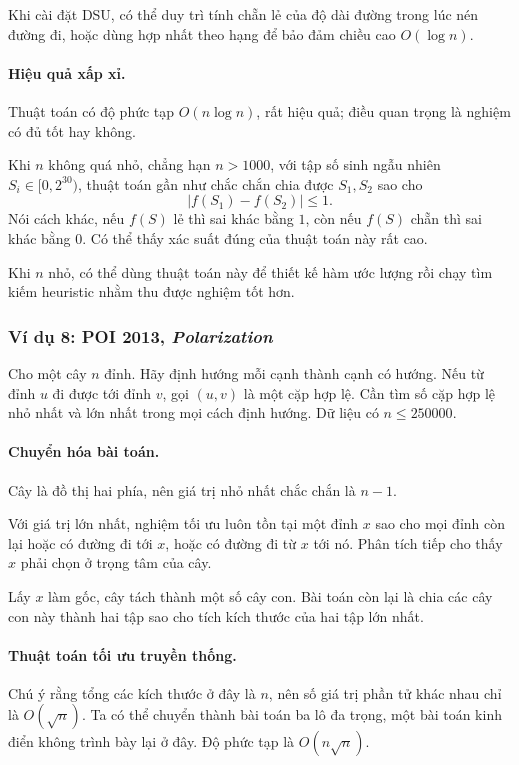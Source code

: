 \documentclass[11pt]{article}
\begin{document}
Khi cài đặt DSU, có thể duy trì tính chẵn lẻ của độ dài đường trong lúc nén
đường đi, hoặc dùng hợp nhất theo hạng để bảo đảm chiều cao \(O(\log n)\).

\paragraph{Hiệu quả xấp xỉ.}
Thuật toán có độ phức tạp \(O(n\log n)\), rất hiệu quả; điều quan trọng là nghiệm
có đủ tốt hay không.

Khi \(n\) không quá nhỏ, chẳng hạn \(n>1000\), với tập số sinh ngẫu nhiên
\(S_i\in[0,2^{30})\), thuật toán gần như chắc chắn chia được \(S_1,S_2\) sao cho
\[
  |f(S_1)-f(S_2)|\le 1.
\]
Nói cách khác, nếu \(f(S)\) lẻ thì sai khác bằng \(1\), còn nếu \(f(S)\) chẵn
thì sai khác bằng \(0\). Có thể thấy xác suất đúng của thuật toán này rất cao.

Khi \(n\) nhỏ, có thể dùng thuật toán này để thiết kế hàm ước lượng rồi chạy tìm
kiếm heuristic nhằm thu được nghiệm tốt hơn.

\subsubsection{Ví dụ 8: POI 2013, \emph{Polarization}}

Cho một cây \(n\) đỉnh. Hãy định hướng mỗi cạnh thành cạnh có hướng. Nếu từ đỉnh
\(u\) đi được tới đỉnh \(v\), gọi \((u,v)\) là một cặp hợp lệ. Cần tìm số cặp
hợp lệ nhỏ nhất và lớn nhất trong mọi cách định hướng. Dữ liệu có
\(n\le 250000\).

\paragraph{Chuyển hóa bài toán.}
Cây là đồ thị hai phía, nên giá trị nhỏ nhất chắc chắn là \(n-1\).

Với giá trị lớn nhất, nghiệm tối ưu luôn tồn tại một đỉnh \(x\) sao cho mọi đỉnh
còn lại hoặc có đường đi tới \(x\), hoặc có đường đi từ \(x\) tới nó. Phân tích
tiếp cho thấy \(x\) phải chọn ở trọng tâm của cây.

Lấy \(x\) làm gốc, cây tách thành một số cây con. Bài toán còn lại là chia các
cây con này thành hai tập sao cho tích kích thước của hai tập lớn nhất.

\paragraph{Thuật toán tối ưu truyền thống.}
Chú ý rằng tổng các kích thước ở đây là \(n\), nên số giá trị phần tử khác nhau
chỉ là \(O(\sqrt n)\). Ta có thể chuyển thành bài toán ba lô đa trọng, một bài
toán kinh điển không trình bày lại ở đây. Độ phức tạp là \(O(n\sqrt n)\).
\end{document}
